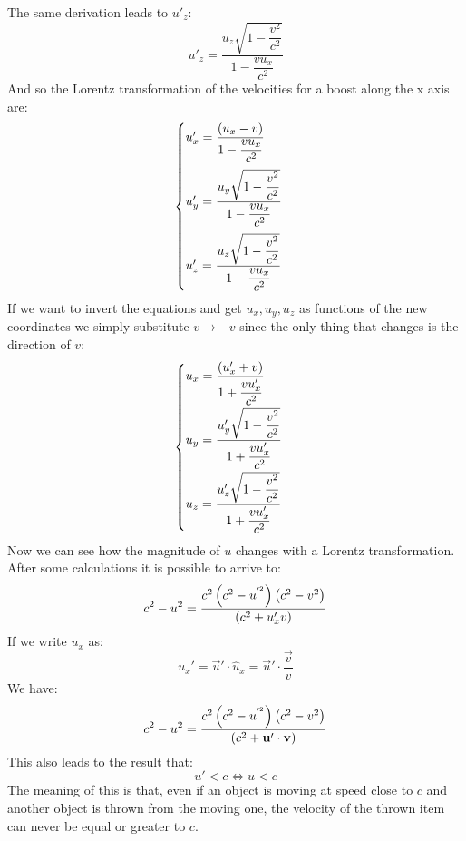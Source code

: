 The same derivation leads to $u'_z$:
\begin{equation}
  u'_z = \dfrac{u_z\sqrt{1-\dfrac{v^2}{c^2}}}{1 - \dfrac{v u_x}{c^2}}
\end{equation}
And so the Lorentz transformation of the velocities for a boost along the x axis are:
\begin{equation}
  \begin{cases}
    u'_x = \dfrac{\left(u_x - v\right)}{1 - \dfrac{v u_x}{c^2}} \\[18pt]
    u'_y = \dfrac{u_y\sqrt{1-\dfrac{v^2}{c^2}}}{1 - \dfrac{v u_x}{c^2}} \\[18pt]
    u'_z = \dfrac{u_z\sqrt{1-\dfrac{v^2}{c^2}}}{1 - \dfrac{v u_x}{c^2}}
  \end{cases}
\end{equation}
If we want to invert the equations and get $u_x, u_y, u_z$ as functions of the new coordinates we simply substitute $v \rightarrow -v$ since the only thing that changes is the direction of $v$:
\begin{equation}
  \begin{cases}
    u_x = \dfrac{\left(u'_x + v\right)}{1 + \dfrac{v u'_x}{c^2}} \\[18pt]
    u_y = \dfrac{u'_y\sqrt{1-\dfrac{v^2}{c^2}}}{1 + \dfrac{v u'_x}{c^2}} \\[18pt]
    u_z = \dfrac{u'_z\sqrt{1-\dfrac{v^2}{c^2}}}{1 + \dfrac{v u'_x}{c^2}}
  \end{cases}
\end{equation}
Now we can see how the magnitude of $u$ changes with a Lorentz transformation. After some calculations it is possible to arrive to:
\begin{equation}
  c^2 - u^2 = \dfrac{c^2\left(c^2 - u^{'^2}\right)\left(c^2 - v^2\right)}{\left(c^2 + u'_x v\right)}
\end{equation}
If we write $u_x$ as:
\begin{equation}
  u_x' = \vec{u}' \cdot \hat{u}_x = \vec{u}' \cdot \dfrac{\vec{v}}{v}
\end{equation}
We have:
\begin{equation}
  c^2 - u^2 = \dfrac{c^2\left(c^2 - u^{'^2}\right)\left(c^2 - v^2\right)}{\left(c^2 + \vb{u}'\cdot\vb{v}\right)}
\end{equation}
This also leads to the result that:
\begin{equation}
  u' < c \iff u < c
\end{equation}
The meaning of this is that, even if an object is moving at speed close to $c$ and another object is thrown from the moving one, the velocity of the thrown item can never be equal or greater to $c$.\\
